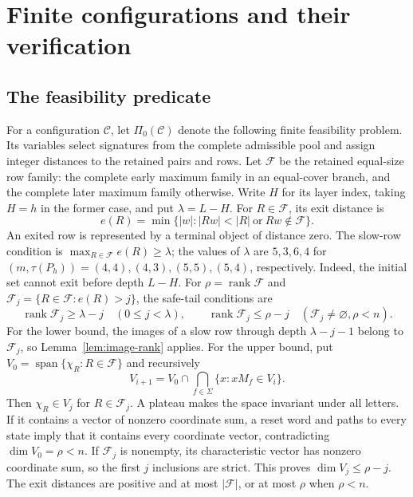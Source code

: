 \documentclass[11pt]{article}
\theoremstyle{definition}
\theoremstyle{plain}
\begin{document}
\section{Finite configurations and their verification}\label{app:finite-verification}

\subsection{The feasibility predicate}
For a configuration $\mathcal C$, let $\Pi_0(\mathcal C)$ denote the
following finite feasibility problem. Its variables select signatures
from the complete admissible pool and assign integer distances to the
retained pairs and rows. Let $\mathcal F$ be the retained equal-size
row family: the complete early maximum family in an equal-cover branch,
and the complete later maximum family otherwise. Write $H$ for its
layer index, taking $H=h$ in the former case, and put $\lambda=L-H$.
For $R\in\mathcal F$, its exit distance is
\[
 e(R)=\min\{|w|:|Rw|<|R|\ \text{or}\ Rw\notin\mathcal F\}.
\]
An exited row is represented by a terminal object of distance zero.
The slow-row condition is $\max_{R\in\mathcal F}e(R)\ge \lambda$;
the values of $\lambda$ are $5,3,6,4$ for
$(m,\tau(P_h))=(4,4),(4,3),(5,5),(5,4)$, respectively. Indeed, the initial set cannot exit before depth $L-H$.
For $\rho=\operatorname{rank}\mathcal F$ and
$\mathcal F_j=\{R\in\mathcal F:e(R)>j\}$, the safe-tail conditions are
\[
 \operatorname{rank}\mathcal F_j\ge \lambda-j\quad(0\le j<\lambda),
 \qquad
 \operatorname{rank}\mathcal F_j\le \rho-j
 \quad(\mathcal F_j\ne\varnothing, \rho<n).
\]
For the lower bound, the images of a slow row through depth $\lambda-j-1$
belong to $\mathcal F_j$, so Lemma~\ref{lem:image-rank} applies.
For the upper bound, put $V_0=\operatorname{span}\{\chi_R:R\in\mathcal F\}$
and recursively
\[
 V_{i+1}=V_0\cap\bigcap_{f\in\Sigma}\{x:xM_f\in V_i\}.
\]
Then $\chi_R\in V_j$ for $R\in\mathcal F_j$. A plateau makes the
space invariant under all letters. If it contains a vector of nonzero
coordinate sum, a reset word and paths to every state imply that it
contains every coordinate vector, contradicting $\dim V_0=\rho<n$.
If $\mathcal F_j$ is nonempty, its characteristic vector has nonzero
coordinate sum, so the first $j$ inclusions are strict. This proves
$\dim V_j\le \rho-j$.
The exit distances are positive and at most $|\mathcal F|$, or at most
$\rho$ when $\rho<n$.
\end{document}
